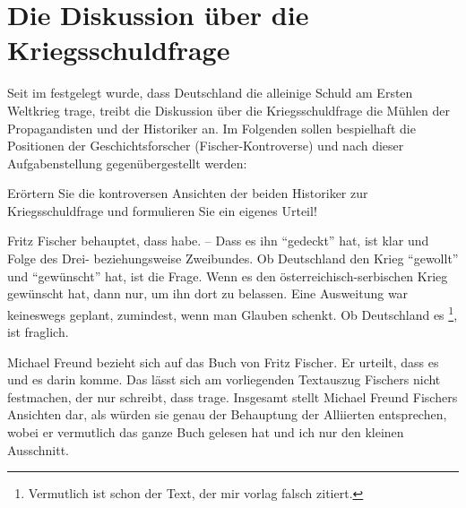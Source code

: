 \section[Die Diskussion über die Kriegsschuldfrage]{Die Diskussion
über die Kriegsschuldfrage}

Seit im  festgelegt wurde, dass
Deutschland die alleinige Schuld am Ersten Weltkrieg trage, treibt die
Diskussion über die Kriegsschuldfrage die Mühlen der Propagandisten
und der Historiker an. Im Folgenden sollen bespielhaft die Positionen
der Geschichtsforscher  (Fischer-Kontroverse) und  nach dieser
Aufgabenstellung gegenübergestellt werden:\\

\begin{aufgabe}
Erörtern Sie die kontroversen Ansichten der beiden Historiker zur
Kriegsschuldfrage und formulieren Sie ein eigenes Urteil!\\
\end{aufgabe}

\noindent Fritz Fischer behauptet, dass  habe.
-- Dass es ihn \enquote{gedeckt} hat, ist klar und Folge des Drei-
beziehungsweise Zweibundes. Ob Deutschland den Krieg \enquote{gewollt}
und \enquote{gewünscht} hat, ist die Frage. Wenn es den
österreichisch-serbischen Krieg gewünscht hat, dann nur, um ihn dort
zu belassen. Eine Ausweitung war keineswegs geplant, zumindest, wenn
man \cite{19Jh1} Glauben schenkt. Ob Deutschland es \footnote{Vermutlich ist schon der Text, der mir vorlag falsch
zitiert.}, ist fraglich. 

Michael Freund bezieht sich auf das Buch von Fritz Fischer. Er
urteilt, dass es  und
es darin  komme. Das lässt sich am vorliegenden Textauszug
Fischers nicht festmachen, der nur schreibt, dass  trage.
Insgesamt stellt Michael Freund Fischers Ansichten dar, als würden sie
genau der Behauptung der Alliierten entsprechen, wobei er vermutlich
das ganze Buch gelesen hat und ich nur den kleinen Ausschnitt.

